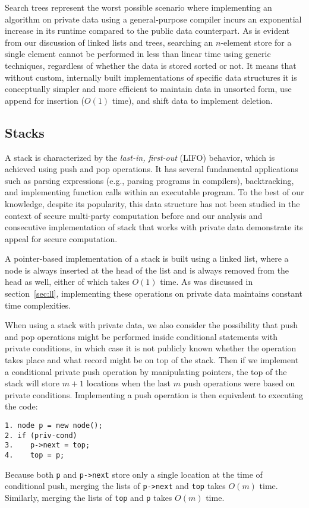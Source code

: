 \documentclass[11pt]{article}
\begin{document}
Search trees represent the worst possible scenario where implementing an
algorithm on private data using a general-purpose compiler incurs an
exponential increase in its runtime compared to the public data counterpart.
As is evident from our discussion of linked lists and trees, searching an
$n$-element store for a single element cannot be performed in less than
linear time using generic techniques, regardless of whether the data is
stored sorted or not. It means that without custom, internally built
implementations of specific data structures it is conceptually simpler and
more efficient to maintain data in unsorted form, use append for insertion
($O(1)$ time), and shift data to implement deletion.

\subsection{Stacks}

A stack is characterized by the \textit{last-in, first-out} (LIFO) behavior,
which is achieved using push and pop operations. It has several fundamental
applications such as parsing expressions (e.g., parsing programs in
compilers), backtracking, and implementing function calls within an
executable program. To the best of our knowledge, despite its popularity,
this data structure has not been studied in the context of secure
multi-party computation before and our analysis and consecutive
implementation of stack that works with private data demonstrate its appeal
for secure computation.

A pointer-based implementation of a stack is built using a linked list,
where a node is always inserted at the head of the list and is always
removed from the head as well, either of which takes $O(1)$ time. As was
discussed in section~\ref{sec:ll}, implementing these operations on private
data maintains constant time complexities.

When using a stack with private data, we also consider the possibility that
push and pop operations might be performed inside conditional statements
with private conditions, in which case it is not publicly known whether the
operation takes place and what record might be on top of the stack. Then if
we implement a conditional private push operation by manipulating pointers,
the top of the stack will store $m+1$ locations when the last $m$ push
operations were based on private conditions. Implementing a push operation
is then equivalent to executing the code:

{\small \begin{verbatim}
1. node p = new node();
2. if (priv-cond)
3.    p->next = top;
4.    top = p;
\end{verbatim}} 
\noindent Because both \texttt{p} and \texttt{p->next} store
only a single location at the time of conditional push, merging the lists of
\texttt{p->next} and \texttt{top} takes $O(m)$ time. Similarly, merging the
lists of \texttt{top} and \texttt{p} takes $O(m)$ time.
\end{document}
